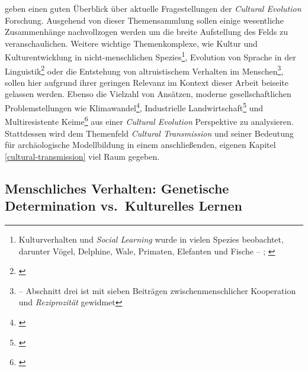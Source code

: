 \documentclass[openany,twoside,twocolumn]{book}
\let\rmarkdownfootnote\footnote%
\def\footnote{\protect\rmarkdownfootnote}
\begin{document}
\textcite{creanza_cultural_2017} geben einen guten Überblick über
aktuelle Fragestellungen der \emph{Cultural Evolution} Forschung.
Ausgehend von dieser Themensammlung sollen einige wesentliche
Zusammenhänge nachvollzogen werden um die breite Aufstellung des Felds
zu veranschaulichen. Weitere wichtige Themenkomplexe, wie Kultur und
Kulturentwicklung in nicht-menschlichen Spezies\footnote{Kulturverhalten
  und \emph{Social Learning} wurde in vielen Spezies beobachtet,
  darunter Vögel, Delphine, Wale, Primaten, Elefanten und Fische --
  \textcite{eerkens_cultural_2007}; \textcite{laland_question_2009}},
Evolution von Sprache in der Linguistik\footnote{\textcite{nowak_evolution_1999}}
oder die Entstehung von altruistischem Verhalten im Menschen\footnote{\textcite{boyd_origin_2005}
  -- Abschnitt drei ist mit sieben Beiträgen zwischenmenschlicher
  Kooperation und \emph{Reziprozität} gewidmet}, sollen hier aufgrund
ihrer geringen Relevanz im Kontext dieser Arbeit beiseite gelassen
werden. Ebenso die Vielzahl von Ansätzen, moderne gesellschaftlichen
Problemstellungen wie Klimawandel\footnote{\textcite{seneviratne_allowable_2016}},
Industrielle Landwirtschaft\footnote{\textcite{garibaldi_farming_2017}}
und Multiresistente Keime\footnote{\textcite{boni_evolution_2005}} aus
einer \emph{Cultural Evolution} Perspektive zu analysieren. Stattdessen
wird dem Themenfeld \emph{Cultural Transmission} und seiner Bedeutung
für archäologische Modellbildung in einem anschließenden, eigenen
Kapitel \ref{cultural-transmission} viel Raum gegeben.

\hypertarget{menschliches-verhalten-genetische-determination-vs.kulturelles-lernen}{%
\subsection{Menschliches Verhalten: Genetische Determination
vs.~Kulturelles
Lernen}\label{menschliches-verhalten-genetische-determination-vs.kulturelles-lernen}}
\end{document}
